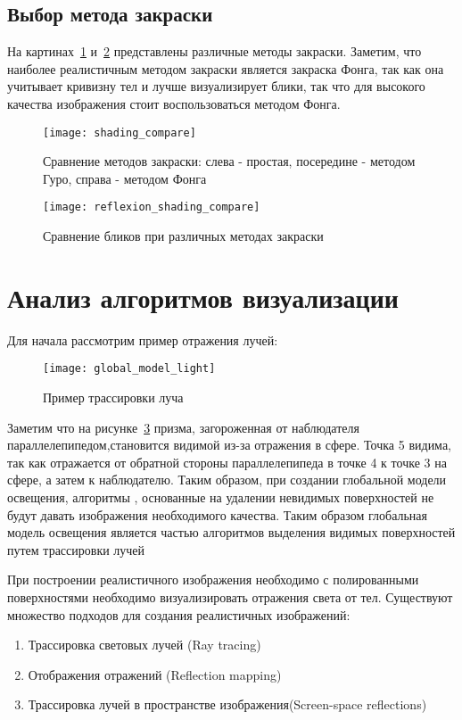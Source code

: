 \subsection{Выбор метода закраски}
На картинах~\ref{fig:shading_compare} и~\ref{fig:reflexion_shading_compare} представлены различные методы закраски. Заметим, что наиболее реалистичным методом закраски является
закраска Фонга, так как она учитывает кривизну тел и лучше визуализирует блики, так что для высокого качества изображения стоит воспользоваться методом Фонга.

\begin{figure}[H]
	\centering
	\texttt{[image: shading\_compare]}
	\caption{Сравнение методов закраски: слева - простая, посередине - методом Гуро, справа - методом Фонга}
	\label{fig:shading_compare}
\end{figure}

\begin{figure}[H]
	\centering
	\texttt{[image: reflexion\_shading\_compare]}
	\caption{Сравнение бликов при различных методах закраски}
	\label{fig:reflexion_shading_compare}
\end{figure}






\section[Анализ алгоритмов создания отражений]{Анализ алгоритмов визуализации}

Для начала рассмотрим пример отражения лучей:

\begin{figure}[H]
	\centering
	\texttt{[image: global\_model\_light]}
	\caption{Пример трассировки луча}
	\label{fig:global_model_light}
\end{figure} 

Заметим что на рисунке~\ref{fig:global_model_light}  призма, загороженная от наблюдателя параллелепипедом,становится видимой из-за отражения в сфере.
Точка 5 видима, так как отражается от обратной стороны параллелепипеда в точке 4 к точке 3 на сфере, а затем к наблюдателю.
Таким образом, при создании глобальной модели освещения, алгоритмы , основанные на удалении невидимых поверхностей не будут давать изображения необходимого качества.
Таким образом глобальная модель освещения является частью алгоритмов выделения видимых поверхностей путем трассировки лучей\cite{Rodgers}


При построении реалистичного изображения необходимо с полированными поверхностями необходимо визуализировать отражения света от тел.
Существуют множество подходов для создания реалистичных изображений:
\begin{enumerate}
	\item Трассировка световых лучей (Ray tracing)
	\item Отображения отражений (Reflection mapping)
	\item Трассировка лучей в пространстве изображения(Screen-space reflections)
\end{enumerate}





